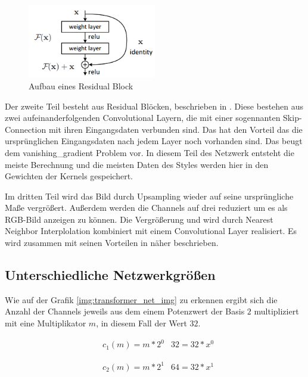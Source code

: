 \begin{figure}[H]
	\centering
	\includegraphics[width=0.50\textwidth]{resources/content/residual_block.png}
	\caption{Aufbau eines Residual Block \cite{residual_block_img}}
	\label{img:residual_block_img}
\end{figure}

Der zweite Teil besteht aus Residual Blöcken, beschrieben in \cite{DBLP:journals/corr/HeZRS15}. Diese bestehen aus zwei aufeinanderfolgenden Convolutional Layern, die mit einer sogennanten Skip-Connection mit ihren Eingangsdaten verbunden sind. Das hat den Vorteil das die ursprünglichen Eingangsdaten nach jedem Layer noch vorhanden sind. Das beugt dem \gls{vanishing_gradient} Problem vor. In diesem Teil des Netzwerk entsteht die meiste Berechnung und die meisten Daten des Styles werden hier in den Gewichten der Kernels gespeichert.

Im dritten Teil wird das Bild durch Upsampling wieder auf seine ursprüngliche Maße vergrößert. Außerdem werden die Channels auf drei reduziert um es als RGB-Bild anzeigen zu können. Die Vergrößerung und wird durch Nearest Neighbor Interplolation kombiniert mit einem Convolutional Layer realisiert.
Es wird zusammen mit seinen Vorteilen in \cite{odena2016deconvolution} näher beschrieben.

\pagebreak

\subsection{Unterschiedliche Netzwerkgrößen}

Wie auf der Grafik \ref{img:transformer_net_img} zu erkennen ergibt sich die Anzahl der Channels jeweils aus dem einem Potenzwert der Basis $ 2 $ multipliziert mit eine Multiplikator $ m $, in diesem Fall der Wert $ 32 $.

\begin{align}
	& c_{1}(m) = m * 2^{0}
	& 32 = 32 * x^{0}
\end{align}

\begin{align}
	& c_{2}(m) = m * 2^{1}
	& 64 = 32 * x^{1}
\end{align}

